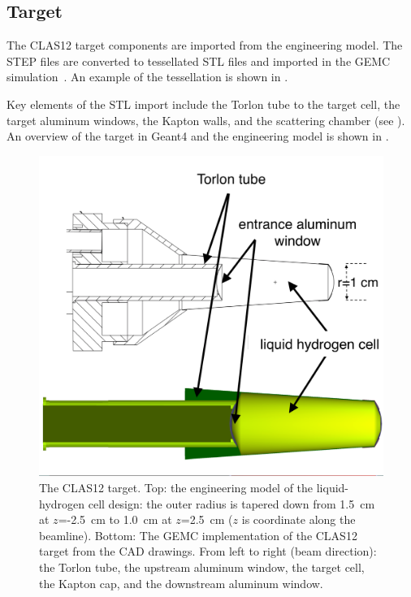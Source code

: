 \subsection{Target}

The CLAS12 target components are imported from the engineering model. The STEP files are converted to tessellated
STL files and imported in the GEMC simulation~\cite{targetCorrection, targetStudy}. An example of the tessellation is
shown in .

Key elements of the STL import include the Torlon tube to the target cell,
the target aluminum windows, the Kapton walls, and the scattering chamber (see ).
An overview of the target in Geant4 and the engineering model is shown in .

\begin{figure}
	\centering
	\includegraphics[width=0.99\columnwidth,keepaspectratio]{img/targetDesign.png}
	\caption{The CLAS12 target. Top: the engineering model of the liquid-hydrogen cell design: the outer radius is
             tapered down from 1.5~cm at $z$=-2.5~cm to 1.0~cm at $z$=2.5~cm ($z$ is coordinate along the beamline).
             Bottom: The GEMC implementation of the CLAS12 target from the CAD drawings. From left to right (beam
             direction): the Torlon tube, the upstream aluminum window, the target cell, the Kapton cap, and the
             downstream aluminum window.}
	\label{fig:targetDesign}
\end{figure}

